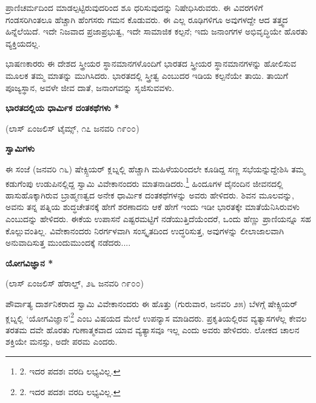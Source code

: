 ಪ್ರಾಣಿಚರ್ಮದಿಂದ ಮಾಡಲ್ಪಟ್ಟಿರುವುದರಿಂದ ಶೂ ಧರಿಸುವುದನ್ನು ನಿಷೇಧಿಸಿರುವರು. ಈ ವಿವರಗಳಿಗೆ ಗಂಡಸರಿಗಿಂತಲೂ ಹೆಚ್ಚಾಗಿ ಹೆಂಗಸರು ಗಮನ ಕೊಡುವರು. ಈ ಎಲ್ಲ ರೂಢಿಗಳಿಗೂ ಅವುಗಳದ್ದೇ ಆದ ತತ್ತ್ವದ ಹಿನ್ನೆಲೆಯಿದೆ. ಇದೇ ನಿಜವಾದ ಪ್ರಜಾಪ್ರಭುತ್ವ, ಇದೇ ಸಾಮಾಜಿಕ ಕಲ್ಪನೆ; ಇದು ಜನಾಂಗಗಳ ಅಭಿವೃದ್ಧಿಯೇ ಹೊರತು ವ್ಯಕ್ತಿಯದಲ್ಲ.

ಭಾಷಣಕಾರರು ಈ ದೇಶದ ಸ್ತ್ರೀಯರ ಸ್ಥಾನಮಾನಗಳೊಂದಿಗೆ ಭಾರತದ ಸ್ತ್ರೀಯರ ಸ್ಥಾನಮಾನಗಳನ್ನು ಹೋಲಿಸುವ ಮೂಲಕ ತಮ್ಮ ಮಾತನ್ನು ಮುಗಿಸಿದರು. ಭಾರತದಲ್ಲಿ ಸ್ತ್ರೀತ್ವ ಎಂಬುದರ ಇಡಿಯ ಕಲ್ಪನೆಯೇ ತಾಯಿ. ತಾಯಿಗೆ ಪೂಜ್ಯಸ್ಥಾನ, ಅವಳೇ ಜೀವ ದಾತೆ, ಜನಾಂಗವನ್ನು ಸೃಜಿಸುವವಳು.

\begin{center}
\textbf{ಭಾರತದಲ್ಲಿಯ ಧಾರ್ಮಿಕ ದಂತಕಥೆಗಳು *}
\end{center}

\begin{center}
(ಲಾಸ್ ಏಂಜಲಿಸ್ ಟೈಮ್ಸ್, ೧೭ ಜನವರಿ ೧೯೦೦)
\end{center}

\begin{center}
\textbf{ಸ್ವಾಮಿಗಳು}
\end{center}

ಈ ಸಂಜೆ (ಜನವರಿ ೧೬) ಷೇಕ್ಸ್ಪಿಯರ್ ಕ್ಲಬ್ನಲ್ಲಿ ಹೆಚ್ಚಾಗಿ ಮಹಿಳೆಯರಿಂದಲೇ ಕೂಡಿದ್ದ ಸಣ್ಣ ಸಭೆಯನ್ನುದ್ದೇಶಿಸಿ ತಮ್ಮ ಕಡುಗೆಂಪು ಉಡುಪಿನಲ್ಲಿದ್ದ ಸ್ವಾಮಿ ವಿವೇಕಾನಂದರು ಮಾತನಾಡಿದರು.\footnote{2. ಇದರ ಪದಶಃ ವರದಿ ಲಭ್ಯವಿಲ್ಲ.} ಹಿಂದೂಗಳ ದೈನಂದಿನ ಜೀವನದಲ್ಲಿ ಹಾಸುಹೊಕ್ಕಾಗಿರುವ ಬ್ರಾಹ್ಮಣತ್ವದ ಅನೇಕ ಧಾರ್ಮಿಕ ದಂತಕಥೆಗಳನ್ನು ಅವರು ಹೇಳಿದರು. ಶಿವನ ಮೂಲವನ್ನು, ಅವನು ತನ್ನ ಪತ್ನಿಯ ಶುದ್ಧಚೇತನಕ್ಕೆ ಹೇಗೆ ಶರಣಾದನು ಆಕೆ ಹೇಗೆ ಇಂದು ಇಡೀ ಭಾರತಕ್ಕೇ ಮಾತೆಯೆನಿಸಿರುವಳು ಎಂಬುದನ್ನು ಹೇಳಿದರು. ಈಕೆಯ ಉಪಾಸನೆ ಎಷ್ಟರಮಟ್ಟಿಗೆ ನಡೆಯುತ್ತಿದೆಯೆಂದರೆ, ಒಂದು ಹೆಣ್ಣು ಪ್ರಾಣಿಯನ್ನೂ ಸಹ ಕೊಲ್ಲುವಂತಿಲ್ಲ. ವಿವೇಕಾನಂದರು ನಿರರ್ಗಳವಾಗಿ ಸಂಸ್ಕೃತದಿಂದ ಉದ್ಧರಿಸುತ್ತ, ಅವುಗಳನ್ನು ಲೀಲಾಜಾಲವಾಗಿ ಅನುವಾದಿಸುತ್ತ ಮುಂದುಮುಂದಕ್ಕೆ ನಡೆದರು....

\begin{center}
\textbf{ಯೋಗವಿಜ್ಞಾನ *}
\end{center}

\begin{center}
(ಲಾಸ್ ಏಂಜಲಿಸ್ ಹೆರಾಲ್ಡ್, ೨೬ ಜನವರಿ ೧೯೦೦)
\end{center}

ಪೌರ್ವಾತ್ಯ ದಾರ್ಶನಿಕರಾದ ಸ್ವಾಮಿ ವಿವೇಕಾನಂದರು ಈ ಹೊತ್ತು (ಗುರುವಾರ, ಜನವರಿ ೨೫) ಬೆಳಗ್ಗೆ ಷೇಕ್ಸ್ಪಿಯರ್ ಕ್ಲಬ್ನಲ್ಲಿ ‘ಯೋಗವಿಜ್ಞಾನ’\footnote{2. ಇದರ ಪದಶಃ ವರದಿ ಲಭ್ಯವಿಲ್ಲ.} ಎಂಬ ವಿಷಯದ ಮೇಲೆ ಉಪನ್ಯಾಸ ಮಾಡಿದರು. ಪ್ರಕೃತಿಯಲ್ಲಿರವ ವ್ಯತ್ಯಾಸಗಳೆಲ್ಲ ಕೇವಲ ತರತಮ ದವೇ ಹೊರತು ಗುಣಾತ್ಮಕವಾದ ಯಾವ ವ್ಯತ್ಯಾಸವೂ ಇಲ್ಲ ಎಂದು ಅವರು ಹೇಳಿದರು. ಲೋಕದ ಚಾಲನ ಶಕ್ತಿಯೇ ಮನಸ್ಸು, ಅದೇ ಪರಮ ಎಂದರು.

